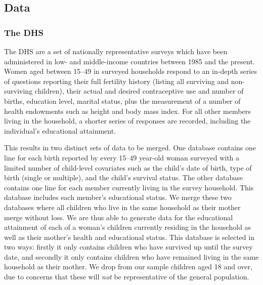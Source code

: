 \subsection{Data}                                  \label{TWINsscn:data}
\subsubsection{The DHS}
The DHS are a set of nationally representative surveys which have been 
administered in low- and middle-income countries between 1985 and the present. 
Women aged between 15--49 in surveyed households respond to an in-depth series 
of questions reporting their full fertility history (listing all surviving and 
non-surviving children), their actual and desired contraceptive use and number 
of births, education level, marital status, plus the measurement of a number of 
health endowments such as height and body mass index. For all other members 
living in the household, a shorter series of responses are recorded, including 
the individual's educational attainment.

This results in two distinct sets of data to be merged. One database contains 
one line for each birth reported by every 15--49 year-old woman surveyed with a 
limited number of child-level covariates such as the child's date of birth, type 
of birth (single or multiple), and the child's survival status. The other 
database contains one line for each member currently living in the survey
household. This database includes each member's educational status. We merge
these two databases where all children who live in the same household as their 
mother merge without loss.  We are thus able to generate data for the educational 
attainment of each of a woman's children currently residing in the household as 
well as their mother's health and educational status. This database is selected in 
two ways: firstly it only contains children who have survived up until the survey 
date, and secondly it only contains children who have remained living in the same 
household as their mother. We drop from our sample children aged 18 and over, due
to concerns that these will \emph{not} be representative of the general 
population.

